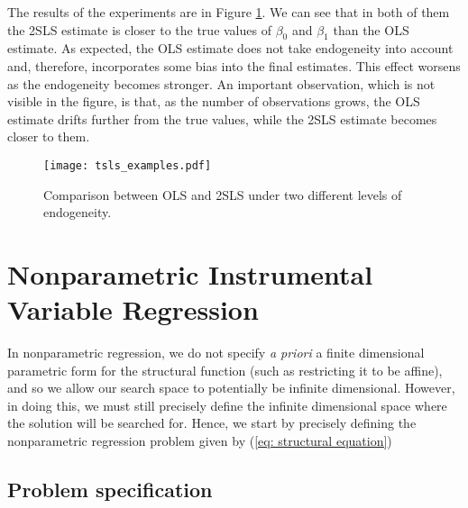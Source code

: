 The results of the experiments are in Figure \ref{fig: 2sls vs ols}.
We can see that in both of them the 2SLS estimate is closer to the true values of $ \beta_{ 0 } $ and $ \beta_{ 1 } $ than the OLS estimate.
As expected, the OLS estimate does not take endogeneity into account and, therefore, incorporates some bias into the final estimates.
This effect worsens as the endogeneity becomes stronger.
An important observation, which is not visible in the figure, is that, as the number of observations grows, the OLS estimate drifts further from the true values, while the 2SLS estimate becomes closer to them.

\begin{figure}[htb]
    \begin{center}
        \texttt{[image: tsls\_examples.pdf]}
    \end{center}
    \caption{Comparison between OLS and 2SLS under two different levels of endogeneity.}
    \label{fig: 2sls vs ols}
\end{figure}

\section{Nonparametric Instrumental Variable Regression}
\label{sec: nonparametric}

In nonparametric regression, we do not specify \emph{a priori} a finite dimensional parametric form for the structural function (such as restricting it to be affine), and so we allow our search space to potentially be infinite dimensional.
However, in doing this, we must still precisely define the infinite dimensional space where the solution will be searched for.
Hence, we start by precisely defining the nonparametric regression problem given by (\ref{eq: structural equation})

\subsection{Problem specification}
\label{sec: problem specification}

